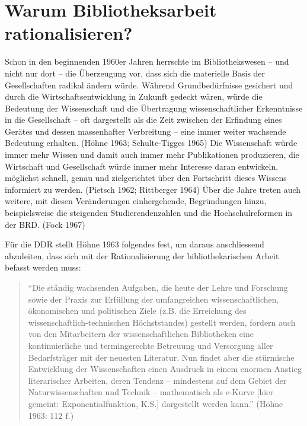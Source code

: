 \documentclass[a4paper,
fontsize=11pt,
oneside,
numbers=noperiodatend,
parskip=half-,
bibliography=totoc,
final
]{scrartcl}
\begin{document}
\hypertarget{warum-bibliotheksarbeit-rationalisieren}{%
\section{Warum Bibliotheksarbeit
rationalisieren?}\label{warum-bibliotheksarbeit-rationalisieren}}

Schon in den beginnenden 1960er Jahren herrschte im Bibliothekswesen --
und nicht nur dort -- die Überzeugung vor, dass sich die materielle
Basis der Gesellschaften radikal ändern würde. Während Grundbedürfnisse
gesichert und durch die Wirtschaftsentwicklung in Zukunft gedeckt wären,
würde die Bedeutung der Wissenschaft und die Übertragung
wissenschaftlicher Erkenntnisse in die Gesellschaft -- oft dargestellt
als die Zeit zwischen der Erfindung eines Gerätes und dessen
massenhafter Verbreitung -- eine immer weiter wachsende Bedeutung
erhalten. (Höhne 1963; Schulte-Tigges 1965) Die Wissenschaft würde immer
mehr Wissen und damit auch immer mehr Publikationen produzieren, die
Wirtschaft und Gesellschaft würde immer mehr Interesse daran entwickeln,
möglichst schnell, genau und zielgerichtet über den Fortschritt dieses
Wissens informiert zu werden. (Pietsch 1962; Rittberger 1964) Über die
Jahre treten auch weitere, mit diesen Veränderungen einhergehende,
Begründungen hinzu, beispielsweise die steigenden Studierendenzahlen und
die Hochschulreformen in der BRD. (Fock 1967)

Für die DDR stellt Höhne 1963 folgendes fest, um daraus anschliessend
abzuleiten, dass sich mit der Rationalisierung der bibliothekarischen
Arbeit befasst werden muss:

\begin{quote}
\enquote{Die ständig wachsenden Aufgaben, die heute der Lehre und Forschung
sowie der Praxis zur Erfüllung der umfangreichen wissenschaftlichen,
ökonomischen und politischen Ziele (z.B. die Erreichung des
wissenschaftlich-technischen Höchststandes) gestellt werden, fordern
auch von den Mitarbeitern der wissenschaftlichen Bibliotheken eine
kontinuierliche und termingerechte Betreuung und Versorgung aller
Bedarfsträger mit der neuesten Literatur. Nun findet aber die stürmische
Entwicklung der Wissenschaften einen Ausdruck in einem enormen Anstieg
literarischer Arbeiten, deren Tendenz -- mindestens auf dem Gebiet der
Naturwissenschaften und Technik -- mathematisch als e-Kurve {[}hier
gemeint: Exponentialfunktion, K.S.{]} dargestellt werden kann.} (Höhne
1963: 112\, f.)
\end{quote}
\end{document}
